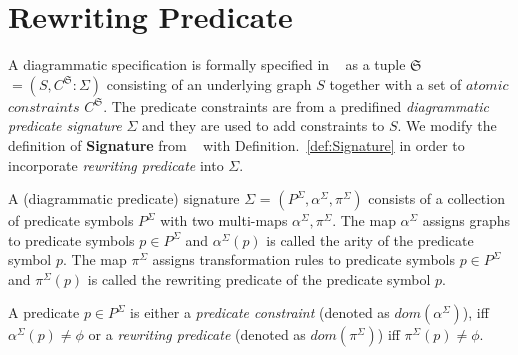 \documentclass{eceasst}
\begin{document}
\section{Rewriting Predicate}\label{lbl:rewritingpredicate}
A diagrammatic specification is formally specified in ~\cite{Rutle10} as a tuple $\mathfrak{S}$ $= (S, C^\mathfrak{S}:\Sigma)$ consisting of an underlying graph $S$ together with a set of 
$atomic$ $constraints$ $C^\mathfrak{S}$. The predicate constraints are from a predifined \textit{diagrammatic predicate signature} $\Sigma$ and they are used to add constraints to $S$. 
We modify the definition of \textbf{Signature} from ~\cite{Rutle10} with Definition.~\ref{def:Signature} in order to incorporate \textit{rewriting predicate} into $\Sigma$.


\begin{definition}[Signature]\label{def:Signature}
 A (diagrammatic predicate) signature $\Sigma$ = $(P^\Sigma, \alpha^\Sigma, \pi^\Sigma)$ consists of a collection of predicate symbols $P^\Sigma$ with two 
 multi-maps $\alpha^\Sigma, \pi^\Sigma$. The map $\alpha^\Sigma$ assigns graphs to predicate symbols $p \in P^\Sigma$ and $\alpha^\Sigma(p)$ is called the arity of the predicate symbol $p$. 
 The map $\pi^\Sigma$ assigns transformation rules to predicate symbols $p \in P^\Sigma$ and $\pi^\Sigma(p)$ is called the rewriting predicate of the predicate symbol $p$. 
\end{definition}

\begin{remark}
A predicate $p \in P^\Sigma$ is either a \textit{predicate constraint} (denoted as $dom(\alpha^\Sigma)$), iff $\alpha^\Sigma(p) \neq \phi$ 
or a \textit{rewriting predicate} (denoted as $dom(\pi^\Sigma)$) iff $\pi^\Sigma(p) \neq \phi$. 
\end{remark}
\end{document}
